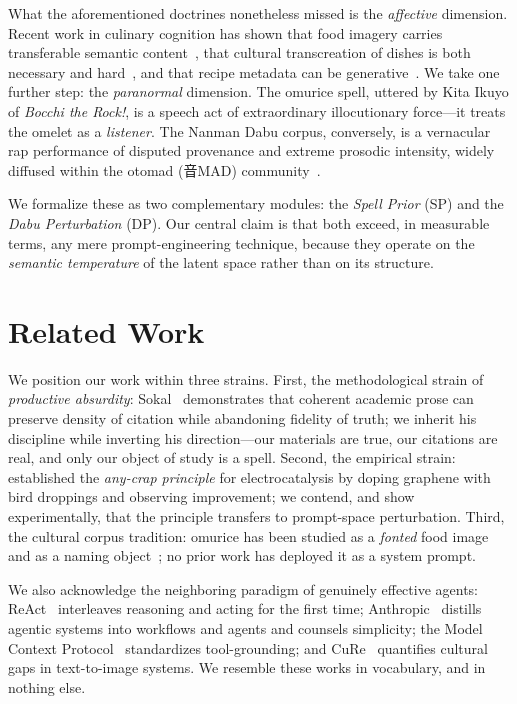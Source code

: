 \documentclass[conference,10pt]{IEEEtran}
\begin{document}
What the aforementioned doctrines nonetheless missed is the
\emph{affective}
dimension. Recent work in culinary cognition has shown that food imagery
carries transferable semantic content~\cite{takagi2025}, that
cultural transcreation of dishes is both necessary and
hard~\cite{khanuja2024}, and that recipe metadata can be
generative~\cite{watanabe2025}. We take one further step: the
\emph{paranormal} dimension. The omurice spell, uttered by Kita
Ikuyo of \emph{Bocchi the Rock!}, is a speech act of extraordinary
illocutionary force---it treats the omelet as a \emph{listener}. The
Nanman Dabu corpus, conversely, is a vernacular rap performance of
disputed provenance and extreme prosodic intensity, widely diffused
within the otomad (音MAD) community~\cite{otomadwiki,
moegirl2026}.

We formalize these as two complementary modules: the \emph{Spell
Prior} (SP) and the \emph{Dabu Perturbation} (DP). Our central claim
is that both exceed, in measurable terms, any mere prompt-engineering
technique, because they operate on the \emph{semantic temperature} of
the latent space rather than on its structure.

\section{Related Work}
We position our work within three strains. First, the methodological
strain of \emph{productive absurdity}: Sokal~\cite{sokal1996}
demonstrates that coherent academic prose can preserve density of
citation while abandoning fidelity of truth; we inherit his
discipline while inverting his direction---our materials are true,
our citations are real, and only our object of study is a spell.
Second, the empirical strain:~\cite{pumera2020} established the
\emph{any-crap principle} for electrocatalysis by doping graphene
with bird droppings and observing improvement; we contend, and show
experimentally, that the principle transfers to prompt-space
perturbation. Third, the cultural corpus tradition: omurice has been
studied as a \emph{fonted} food image~\cite{takagi2025} and as a
naming object~\cite{watanabe2025}; no prior work has deployed it as a
system prompt.

We also acknowledge the neighboring paradigm of genuinely effective
agents: ReAct~\cite{react2022} interleaves reasoning and acting for
the first time; Anthropic~\cite{anthropic2024} distills agentic
systems into workflows and agents and counsels simplicity; the Model
Context
Protocol~\cite{mcp2024} standardizes tool-grounding; and CuRe~\cite{cure2025}
quantifies cultural gaps in text-to-image systems. We resemble these
works in vocabulary, and in nothing else.
\end{document}
